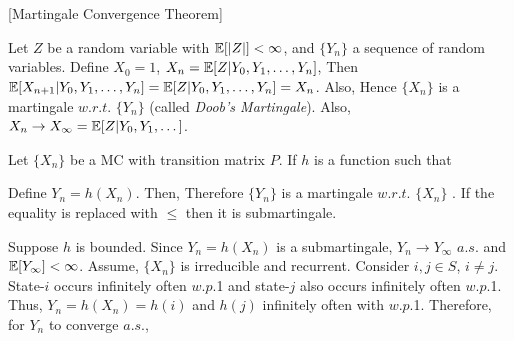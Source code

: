 \documentclass[all-lectures.tex]{subfiles}
\begin{document}

\setcounter{section}{4}
\setcounter{subsection}{1}

\section*{}
[Martingale Convergence Theorem]
\begin{exmp}
Let $Z$ be a random variable with  $\mathbb{E}[|Z|] < \infty$, and  $\{Y_n\}$ a sequence of random variables. Define
$X_0=1$, $X_n = \mathbb{E}[Z|Y_0, Y_1, \dots, Y_n]$, Then $\mathbb{E}[X_{n+1}|Y_0, Y_1, \dots, Y_n] = \mathbb{E}[Z|Y_0, Y_1, \dots, Y_n] = X_n$. Also,
Hence $\{X_n\}$ is a martingale $w.r.t.$ $\{Y_n\}$ (called \textit{Doob's Martingale}).
Also, $X_n \to X_\infty = \mathbb{E}[Z|Y_0, Y_1, \dots]$.
\end{exmp}

\begin{exmp}
Let $\{X_n\}$ be a MC with transition matrix $P$.
If $h$ is a function such that 

Define $Y_n = h(X_n)$. Then,
Therefore $\{Y_n\}$ is a martingale $w.r.t.$ $\{X_n\}$ .
If the equality is replaced with $\le$ then it is submartingale.
\end{exmp}

Suppose $h$ is bounded. Since $Y_n = h(X_n)$ is a submartingale, $Y_n \to Y_\infty$ $a.s.$ and $\mathbb{E}[Y_\infty] < \infty$.
Assume, $\{X_n\}$ is irreducible and recurrent.
Consider $i, j \in S$, $i\neq j$. 
State-$i$ occurs infinitely often $w.p.$1 and state-$j$ also occurs infinitely often $w.p.$1.
Thus, 
$Y_n = h(X_n) = h(i)$ and $h(j)$ infinitely often with $w.p.$1.
Therefore, for $Y_n$ to converge $a.s.$,
\end{document}
